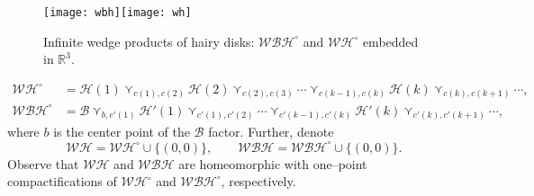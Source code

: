 \documentclass[reqno,12pt]{amsart}
\theoremstyle{ourremark}
\numberwithin{equation}{section}
\numberwithin{theorem}{section}
\begin{document}
\begin{figure}[!ht] 
  \centering
   \texttt{[image: wbh]}\quad \texttt{[image: wh]}
  \caption{Infinite wedge products of hairy disks: $\mathcal{WBH}^\circ$ and $\mathcal{WH}^\circ$ embedded in ${\mathbb{R}}^3$.} \label{fig:WH} 
\end{figure} 
\begin{equation}\label{eq:WH-WBH-o}
\begin{split}
  \mathcal{WH}^\circ & =\mathcal{H}(1)\curlyvee_{c(1),c(2)}\mathcal{H}(2)\curlyvee_{c(2),c(3)}\cdots\curlyvee_{c(k-1),c(k)}\mathcal{H}(k)\curlyvee_{c(k),c(k+1)}\cdots,\\
  \mathcal{WBH}^\circ & =\mathcal{B}\curlyvee_{b,c'(1)} \mathcal{H}'(1)\curlyvee_{c'(1),c'(2)}\cdots\curlyvee_{c'(k-1),c'(k)}\mathcal{H}'(k)\curlyvee_{c'(k),c'(k+1)}\cdots,
\end{split}
\end{equation}
{\noindent} where $b$ is the center point of the $\mathcal{B}$ factor. Further, denote
\begin{equation}\label{eq:WH-WBH}
\mathcal{WH}=\mathcal{WH}^\circ\cup\{(0,0)\},\qquad \mathcal{WBH}=\mathcal{WBH}^\circ\cup\{(0,0)\}.
\end{equation}
{\noindent} Observe that $\mathcal{WH}$ and $\mathcal{WBH}$ are homeomorphic with one--point compactifications of  $\mathcal{WH}^\circ$ and $\mathcal{WBH}^\circ$, respectively. 
 
\end{document}
